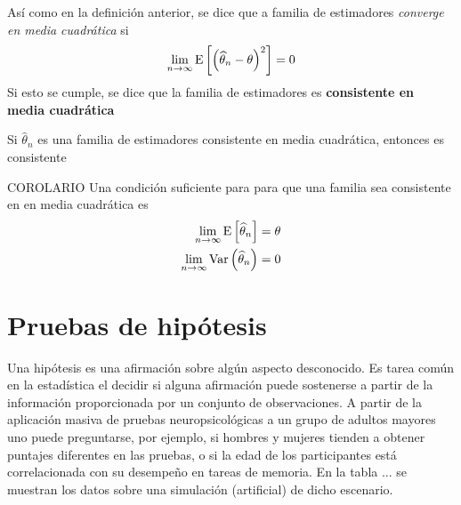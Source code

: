 \begin{definicion}
Así como en la definición anterior, se dice que a familia de estimadores \textit{converge en media cuadrática} si
\begin{equation}
\lim_{n\rightarrow\infty} \mathrm{E}\left[ \left( \widehat{\theta}_n - \theta \right)^{2} \right] = 0
\end{equation}
Si esto se cumple, se dice que la familia de estimadores es \textbf{consistente en media cuadrática} \end{definicion}

\begin{proposicion}
Si $\widehat{\theta}_n$ es una familia de estimadores consistente en media cuadrática, entonces es consistente
\end{proposicion}

\begin{proposicion} COROLARIO
Una condición suficiente para para que una familia sea consistente en en media cuadrática es
\begin{align}
\lim_{n\rightarrow\infty} \mathrm{E}\left[ \widehat{\theta}_n \right] &= \theta \\
\lim_{n\rightarrow\infty} \mathrm{Var}\left( \widehat{\theta}_n \right) &= 0
\end{align}
\end{proposicion}





\section{Pruebas de hipótesis}


Una hipótesis es una afirmación sobre algún aspecto desconocido.
%
Es tarea común en la estadística el decidir si alguna afirmación puede sostenerse a partir de la
información proporcionada por un conjunto de observaciones. 
%
A partir de la aplicación masiva de pruebas neuropsicológicas a un grupo de adultos mayores uno 
puede preguntarse, por ejemplo, si hombres y mujeres tienden a obtener puntajes diferentes en las
pruebas, o si la edad de los participantes está correlacionada con su desempeño en tareas de 
memoria.
%
En la tabla ... se muestran los datos sobre una simulación (artificial) de dicho escenario.

